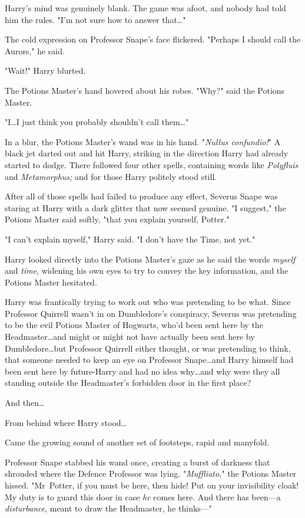 Harry's mind was genuinely blank. The game was afoot, and nobody had told him
the rules. "I'm not sure how to answer that…"

The cold expression on Professor Snape's face flickered. "Perhaps I should call
the Aurors," he said.

"Wait!" Harry blurted.

The Potions Master's hand hovered about his robes. "Why?" said the Potions
Master.

"I…I just think you probably shouldn't call them…"

In a blur, the Potions Master's wand was in his hand. "\emph{Nullus
confundio!}" A black jet darted out and hit Harry, striking in the direction
Harry had already started to dodge. There followed four other spells,
containing words like \emph{Polyfluis} and \emph{Metamorphus;} and for those
Harry politely stood still.

After all of those spells had failed to produce any effect, Severus Snape was
staring at Harry with a dark glitter that now seemed genuine. "I suggest," the
Potions Master said softly, "that you explain yourself, Potter."

"I can't explain myself," Harry said. "I don't have the Time, not yet."

Harry looked directly into the Potions Master's gaze as he said the words
\emph{myself} and \emph{time}, widening his own eyes to try to convey the key
information, and the Potions Master hesitated.

Harry was frantically trying to work out who was pretending to be what. Since
Professor Quirrell wasn't in on Dumbledore's conspiracy, Severus was pretending
to be the evil Potions Master of Hogwarts, who'd been sent here by the
Headmaster…and might or might not have actually been sent here by
Dumbledore…but Professor Quirrell either thought, or was pretending to
think, that someone needed to keep an eye on Professor Snape…and Harry
himself had been sent here by future-Harry and had no idea why…and why
were they all standing outside the Headmaster's forbidden door in the first
place?

And then…

From behind where Harry stood…

Came the growing sound of another set of footsteps, rapid and manyfold.

Professor Snape stabbed his wand once, creating a burst of darkness that
shrouded where the Defence Professor was lying. "\emph{Muffliato,}" the Potions
Master hissed. "Mr~Potter, if you must be here, then hide! Put on your
invisibility cloak! My duty is to guard this door in case \emph{he} comes here.
And there has been—a \emph{disturbance}, meant to draw the Headmaster, he
thinks—"


